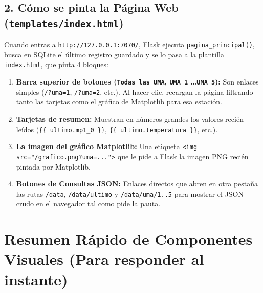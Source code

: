 \documentclass[11pt,a4paper]{article}
\begin{document}
\subsection{2. Cómo se pinta la Página Web (\texttt{templates/index.html})}
Cuando entras a \texttt{http://127.0.0.1:7070/}, Flask ejecuta \texttt{pagina\_principal()}, busca en SQLite el último registro guardado y se lo pasa a la plantilla \texttt{index.html}, que pinta 4 bloques:
\begin{enumerate}[leftmargin=1.5em]
    \item \textbf{Barra superior de botones (\texttt{Todas las UMA}, \texttt{UMA 1} \dots \texttt{UMA 5}):} Son enlaces simples (\texttt{/?uma=1}, \texttt{/?uma=2}, etc.). Al hacer clic, recargan la página filtrando tanto las tarjetas como el gráfico de Matplotlib para esa estación.
    \item \textbf{Tarjetas de resumen:} Muestran en números grandes los valores recién leídos (\texttt{\{\{ ultimo.mp1\_0 \}\}}, \texttt{\{\{ ultimo.temperatura \}\}}, etc.).
    \item \textbf{La imagen del gráfico Matplotlib:} Una etiqueta \texttt{<img src="/grafico.png?uma=...">} que le pide a Flask la imagen PNG recién pintada por Matplotlib.
    \item \textbf{Botones de Consultas JSON:} Enlaces directos que abren en otra pestaña las rutas \texttt{/data}, \texttt{/data/ultimo} y \texttt{/data/uma/1..5} para mostrar el JSON crudo en el navegador tal como pide la pauta.
\end{enumerate}

\section{Resumen Rápido de Componentes Visuales (Para responder al instante)}
\end{document}
